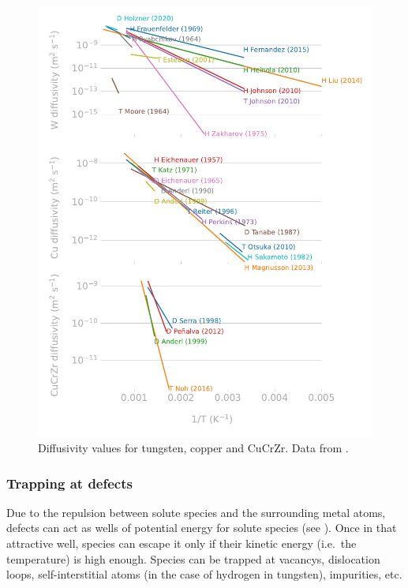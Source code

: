 
\begin{figure}
    \centering
    \includegraphics[width=0.8\linewidth]{Figures/Chapter1/materials_diffusivity_review_comparison.pdf}
    \caption{Diffusivity values for tungsten, copper and CuCrZr. Data from \cite{delaporte-mathurin_remdelaportemathurinh-transport-materials_2022}.}
\end{figure}

\subsubsection{Trapping at defects}

Due to the repulsion between solute species and the surrounding metal atoms, defects can act as wells of potential energy for solute species (see ).
Once in that attractive well, species can escape it only if their kinetic energy (i.e.\ the temperature) is high enough.
Species can be trapped at \glspl{vacancy}, \glspl{dislocation loop}, \gls{self-interstitial} atoms (in the case of hydrogen in tungsten), impurities, etc.

